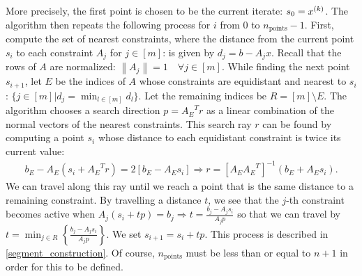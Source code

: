 More precisely, the first point is chosen to be the current iterate: $s_0 = x^{(k)}$.
The algorithm then repeats the following process for $i$ from $0$ to $n_{\text{points}}-1$.
First, compute the set of nearest constraints, where the distance from the current point $s_i$ to each constraint $A_j$ for $j \in [m]$: 
is given by $d_j = b - A_j x$.
Recall that the rows of $A$ are normalized: $\left\|A_j\right\| = 1 \quad \forall j \in [m]$.
While finding the next point $s_{i+1}$, let  $E$ be the indices of $A$ whose constraints are equidistant and nearest to $s_i$:
$\{j \in [m] | d_j = \min_{l \in [m]} d_l\}$.
Let the remaining indices be $R = [m] \setminus E$.
The algorithm chooses a search direction $p = {A_E}^Tr$ as a linear combination of the normal vectors of the nearest constraints.
This search ray $r$ can be found by computing a point $s_i$ whose distance to each equidistant constraint is twice its current value:
\begin{align*}
b_E - A_E(s_i + {A_E}^Tr) = 2 \left[b_E - A_Es_i\right] \Longrightarrow r = \left[A_E{A_E}^T\right]^{-1}\left(b_E + A_E s_i\right).
\end{align*}
We can travel along this ray until we reach a point that is the same distance to a remaining constraint.
By travelling a distance $t$, we see that the $j$-th constraint becomes active when
$A_j (s_i + t p) = b_j \Longrightarrow t = \frac{b_j - A_j s_i}{A_jp}$
so that we can travel by 
$t = \min_{j \in R} \left\{\frac{b_j - A_j s_i}{A_jp}  \right\}. $
We set $s_{i+1} = s_{i} + t p$.
This process is described in \cref{segment_construction}.
Of course, $n_{\text{points}}$ must be less than or equal to $n + 1$ in order for this to be defined.


